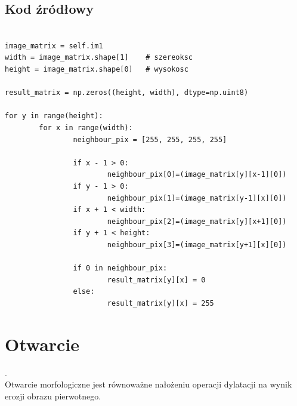 \documentclass[final,a4paper,openany,12pt]{mwbk}
\begin{document}
\subsection*{Kod źródłowy}

\begin{lstlisting}[caption= Operacja nakładania (dylatacji) na obrazie binarnym]

image_matrix = self.im1
width = image_matrix.shape[1]    # szereoksc
height = image_matrix.shape[0]   # wysokosc

result_matrix = np.zeros((height, width), dtype=np.uint8)

for y in range(height):
        for x in range(width):  
                neighbour_pix = [255, 255, 255, 255]

                if x - 1 > 0:
                        neighbour_pix[0]=(image_matrix[y][x-1][0])
                if y - 1 > 0:
                        neighbour_pix[1]=(image_matrix[y-1][x][0])
                if x + 1 < width:
                        neighbour_pix[2]=(image_matrix[y][x+1][0])
                if y + 1 < height:
                        neighbour_pix[3]=(image_matrix[y+1][x][0])

                if 0 in neighbour_pix:
                        result_matrix[y][x] = 0
                else:
                        result_matrix[y][x] = 255          

\end{lstlisting}

\section{ Otwarcie}
.\hfill\\
\indent
	Otwarcie morfologiczne jest równoważne nałożeniu operacji dylatacji na wynik erozji obrazu pierwotnego.
\end{document}
